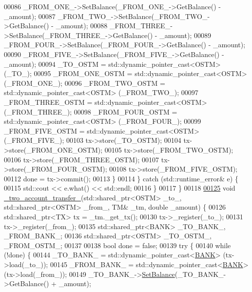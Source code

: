 \begin{DoxyCode}
00086             \_FROM\_ONE\_->SetBalance(\_FROM\_ONE\_->GetBalance() - \_amount);
00087             \_FROM\_TWO\_->SetBalance(\_FROM\_TWO\_->GetBalance() - \_amount);
00088             \_FROM\_THREE\_->SetBalance(\_FROM\_THREE\_->GetBalance() - \_amount);
00089             \_FROM\_FOUR\_->SetBalance(\_FROM\_FOUR\_->GetBalance() - \_amount);
00090             \_FROM\_FIVE\_->SetBalance(\_FROM\_FIVE\_->GetBalance() - \_amount);
00094             \_TO\_OSTM = std::dynamic\_pointer\_cast<OSTM> (\_TO\_);
00095             \_FROM\_ONE\_OSTM = std::dynamic\_pointer\_cast<OSTM> (\_FROM\_ONE\_);
00096             \_FROM\_TWO\_OSTM = std::dynamic\_pointer\_cast<OSTM> (\_FROM\_TWO\_);
00097             \_FROM\_THREE\_OSTM = std::dynamic\_pointer\_cast<OSTM> (\_FROM\_THREE\_);
00098             \_FROM\_FOUR\_OSTM = std::dynamic\_pointer\_cast<OSTM> (\_FROM\_FOUR\_);
00099             \_FROM\_FIVE\_OSTM = std::dynamic\_pointer\_cast<OSTM> (\_FROM\_FIVE\_);
00103             tx->store(\_TO\_OSTM);
00104             tx->store(\_FROM\_ONE\_OSTM);
00105             tx->store(\_FROM\_TWO\_OSTM);
00106             tx->store(\_FROM\_THREE\_OSTM);
00107             tx->store(\_FROM\_FOUR\_OSTM);
00108             tx->store(\_FROM\_FIVE\_OSTM);
00112             done = tx->commit();
00113         \}
00114     \} \textcolor{keywordflow}{catch} (std::runtime\_error& e) \{
00115         std::cout << e.what() << std::endl;
00116     \}
00117 \}
00118 
\hypertarget{main_8cpp_source.tex_l00125}{}\hyperlink{main_8cpp_a83aef8c5b69afef4e38d14c17fe782b3}{00125} \textcolor{keywordtype}{void} \hyperlink{main_8cpp_a83aef8c5b69afef4e38d14c17fe782b3}{\_two\_account\_transfer\_}(std::shared\_ptr<OSTM> \_to\_, std::shared\_ptr<OSTM> \_from\_,
       TM& \_tm, \textcolor{keywordtype}{double} \_amount) \{
00126     std::shared\_ptr<TX> tx = \_tm.\_get\_tx();
00130     tx->\_register(\_to\_);
00131     tx->\_register(\_from\_);
00135     std::shared\_ptr<BANK> \_TO\_BANK\_, \_FROM\_BANK\_;
00136     std::shared\_ptr<OSTM> \_TO\_OSTM\_, \_FROM\_OSTM\_;
00137 
00138     \textcolor{keywordtype}{bool} done = \textcolor{keyword}{false};
00139     \textcolor{keywordflow}{try} \{
00140         \textcolor{keywordflow}{while} (!done) \{
00144             \_TO\_BANK\_ = std::dynamic\_pointer\_cast<\hyperlink{class_b_a_n_k}{BANK}> (tx->load(\_to\_));
00145             \_FROM\_BANK\_ = std::dynamic\_pointer\_cast<\hyperlink{class_b_a_n_k}{BANK}> (tx->load(\_from\_));
00149             \_TO\_BANK\_->\hyperlink{class_b_a_n_k_a43bef9f486c88a2dc4906eee0e38a394}{SetBalance}(\_TO\_BANK\_->GetBalance() + \_amount);

\end{DoxyCode}
